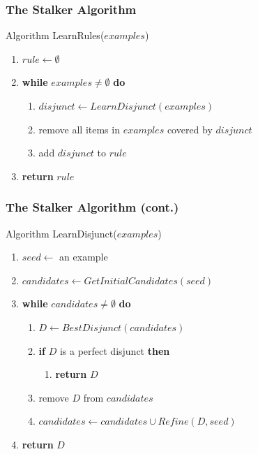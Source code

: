 \documentclass[svgnames]{beamer}
\begin{document}

\begin{frame} \frametitle{The Stalker Algorithm}
  
  \begin{block}{Algorithm LearnRules($examples$)}
    \begin{enumerate}
    \item $rule \leftarrow \emptyset$
    \item \textbf{while} $examples \neq \emptyset$ \textbf{do}
      \begin{enumerate}
      \item $disjunct \leftarrow LearnDisjunct(examples)$
      \item remove all items in $examples$ covered by $disjunct$
      \item add $disjunct$ to $rule$
      \end{enumerate}
    \item \textbf{return} $rule$
    \end{enumerate}
  \end{block}

\end{frame}


\begin{frame} \frametitle{The Stalker Algorithm (cont.)}
  
  \begin{block}{Algorithm LearnDisjunct($examples$)}
    \begin{enumerate}
    \item $seed \leftarrow$ an example
    \item $candidates \leftarrow GetInitialCandidates(seed)$
    \item \textbf{while} $candidates \neq \emptyset$ \textbf{do}
      \begin{enumerate}
      \item $D \leftarrow BestDisjunct(candidates)$
      \item \textbf{if} $D$ is a perfect disjunct \textbf{then}
        \begin{enumerate}
        \item \textbf{return} $D$
        \end{enumerate}
      \item remove $D$ from $candidates$
      \item $candidates \leftarrow candidates \cup Refine(D,seed)$
      \end{enumerate}
    \item \textbf{return} $D$
    \end{enumerate}
  \end{block}

\end{frame}
\end{document}
